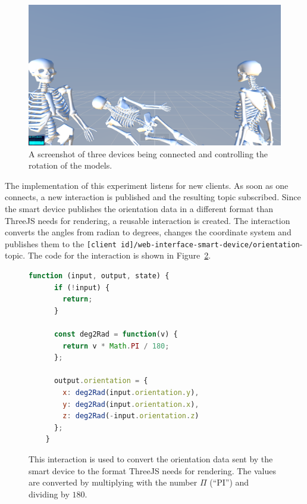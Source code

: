 \begin{figure}[htpb]
  \centering
  \includegraphics[width=12cm]{figures/screenshot_exp_mv.png}
  \caption[Screenshot: model viewer experiment]{A screenshot of three devices being connected and controlling the rotation of the models.}\label{fig:screenshot-exp-mv}
\end{figure}

The implementation of this experiment listens for new clients. As soon as one connects, a new interaction is published and the resulting topic subscribed. Since the smart device publishes the orientation data in a different format than ThreeJS needs for rendering, a reusable interaction is created. The interaction converts the angles from radian to degrees, changes the coordinate system and publishes them to the \lstinline[breaklines=false]{[client id]/web-interface-smart-device/orientation}-topic. The code for the interaction is shown in Figure~\ref{fig:ubii-interaction-angles}.

\begin{figure}[H]
  \begin{lstlisting}[language=JavaScript]
    function (input, output, state) {
      if (!input) {
        return;
      }

      const deg2Rad = function(v) {
        return v * Math.PI / 180;
      };

      output.orientation = {
        x: deg2Rad(input.orientation.y),
        y: deg2Rad(input.orientation.x),
        z: deg2Rad(-input.orientation.z)
      };
    }
  \end{lstlisting}
  \caption[UBII interaction converting euler angles in radians to degrees]{This interaction is used to convert the orientation data sent by the smart device to the format ThreeJS needs for rendering. The values are converted by multiplying with the number $\Pi$ (\enquote{PI}) and dividing by $180$.}\label{fig:ubii-interaction-angles}
\end{figure}


